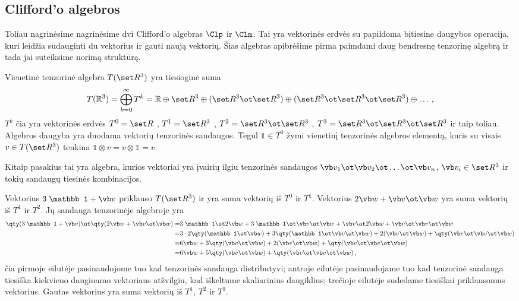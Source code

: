 \subsection{Clifford'o algebros}


Toliau nagrinėsime nagrinėsime dvi Clifford'o algebras $\Clp$ ir $\Clm$.
Tai yra vektorinės erdvės su papildoma bitiesine daugybos operacija,
kuri leidžia sudauginti du vektorius ir gauti naują vektorių.
Šias algebras apibrėšime pirma paimdami daug bendresnę tenzorinę algebrą
ir tada jai suteiksime norimą struktūrą.

\begin{definition}
	Vienetinė tenzorinė algebra $T(\set R^3)$ yra tiesioginė suma
	\begin{equation}
		T(\mathbb{R}^3) 
		=
		\bigoplus_{k=0}^{\infty} T^k
		=
		\mathbb{R} 
		\oplus \set R^3 
		\oplus (\set R^3 \ot \set R^3) 
		\oplus (\set R^3 \ot \set R^3 \ot \set R^3) 
		\oplus \dots
		\,,
	\end{equation}
	$T^k$ čia yra vektorinės erdvės $T^0 = \set R$\: ,\: $T^1=\set R^3$\: ,\: $T^2=\set R^3 \ot \set R^3$\: ,\:
	$T^3=\set R^3 \ot \set R^3 \ot \set R^3$
	ir taip toliau.
	Algebros daugyba yra duodama vektorių tenzorinės sandaugos.
	Tegul $\mathbb1 \in T^0$ žymi vienetinį tenzorinės algebros elementą,
	kuris su visais $v \in T(\set R^3)$ tenkina
	$\mathbb1 \otimes v = v \otimes \mathbb1 = v$.
\end{definition}
Kitaip pasakius tai yra algebra,
kurios vektoriai yra įvairių ilgiu tenzorinės sandaugos
$\vb v_1 \ot \vb v_2 \ot \dots \ot \vb v_n$\:,\: $\vb v_i \in \set R^3$
ir tokių sandaugų tiesinės kombinacijos.
\begin{example}
	Vektorius $3\;\mathbb 1 + \vb v$ priklauso $T(\set R^3)$
	ir yra suma vektorių iš $T^0$ ir $T^1$.
	Vektorius $2\vb w + \vb v \ot \vb w$ yra suma vektorių iš $T^1$ ir $T^2$.
	Jų sandauga tenzorinėje algebroje yra
	\begin{equation}
		\begin{split}
			\qty(3\;\mathbb 1 + \vb v)
			\ot
			\qty(2\vb w + \vb v \ot \vb w)
			=&
			3\;\mathbb 1 \ot 2\vb w
			+ 3\;\mathbb 1 \ot \vb v \ot \vb w
			+ \vb v \ot 2\vb w
			+ \vb v \ot \vb v \ot \vb w
			\\=&
			3\cdot2\qty(\mathbb 1 \ot \vb w)
			+ 3\qty(\mathbb 1 \ot \vb v \ot \vb w)
			+ 2(\vb v \ot \vb w)
			+ \qty(\vb v \ot \vb v \ot \vb w)
			\\=&
			6 \vb w
			+ 3\qty(\vb v \ot \vb w)
			+ 2(\vb v \ot \vb w)
			+ \qty(\vb v \ot \vb v \ot \vb w)
			\\=&
			6 \vb w
			+ 5\qty(\vb v \ot \vb w)
			+ \qty(\vb v \ot \vb v \ot \vb w)
			\,,
		\end{split}
	\end{equation}
	čia pirmoje eilutėje pasinaudojome tuo kad tenzorinės sandauga
	distributyvi; antroje eilutėje pasinaudojame tuo kad tenzorinė sandauga
	tiesiška kiekvieno dauginamo vektoriaus atžvilgiu, kad iškeltume 
	skaliarinius daugiklius; trečioje eilutėje sudedame tiesiškai
	priklausomus vektorius.
	Gautas vektorius yra suma vektorių iš $T^1$, $T^2$ ir $T^3$.
\end{example}


